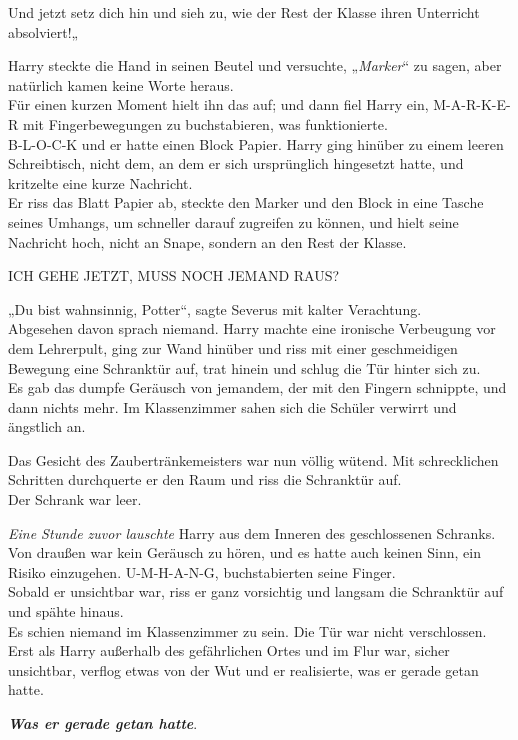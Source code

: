 {Und jetzt setz dich hin und sieh zu, wie der Rest der Klasse ihren Unterricht absolviert!„

Harry steckte die Hand in seinen Beutel und versuchte, „\emph{Marker}“ zu sagen, aber natürlich kamen keine Worte heraus.\\ Für einen kurzen Moment hielt ihn das auf; und dann fiel Harry ein, M-A-R-K-E-R mit Fingerbewegungen zu buchstabieren, was funktionierte.\\ B-L-O-C-K und er hatte einen Block Papier. Harry ging hinüber zu einem leeren Schreibtisch, nicht dem, an dem er sich ursprünglich hingesetzt hatte, und kritzelte eine kurze Nachricht.\\ Er riss das Blatt Papier ab, steckte den Marker und den Block in eine Tasche seines Umhangs, um schneller darauf zugreifen zu können, und hielt seine Nachricht hoch, nicht an Snape, sondern an den Rest der Klasse.

ICH GEHE JETZT, MUSS NOCH JEMAND RAUS?

„Du bist wahnsinnig, Potter“, sagte Severus mit kalter Verachtung.\\ Abgesehen davon sprach niemand. Harry machte eine ironische Verbeugung vor dem Lehrerpult, ging zur Wand hinüber und riss mit einer geschmeidigen Bewegung eine Schranktür auf, trat hinein und schlug die Tür hinter sich zu.\\ Es gab das dumpfe Geräusch von jemandem, der mit den Fingern schnippte, und dann nichts mehr. Im Klassenzimmer sahen sich die Schüler verwirrt und ängstlich an.

Das Gesicht des Zaubertränkemeisters war nun völlig wütend. Mit schrecklichen Schritten durchquerte er den Raum und riss die Schranktür auf.\\ Der Schrank war leer.

\emph{Eine Stunde zuvor lauschte} Harry aus dem Inneren des geschlossenen Schranks.\\ Von draußen war kein Geräusch zu hören, und es hatte auch keinen Sinn, ein Risiko einzugehen. U-M-H-A-N-G, buchstabierten seine Finger.\\ Sobald er unsichtbar war, riss er ganz vorsichtig und langsam die Schranktür auf und spähte hinaus.\\ Es schien niemand im Klassenzimmer zu sein. Die Tür war nicht verschlossen. Erst als Harry außerhalb des gefährlichen Ortes und im Flur war, sicher unsichtbar, verflog etwas von der Wut und er realisierte, was er gerade getan hatte.

\textbf{\emph{Was er gerade getan hatte}}.

}
